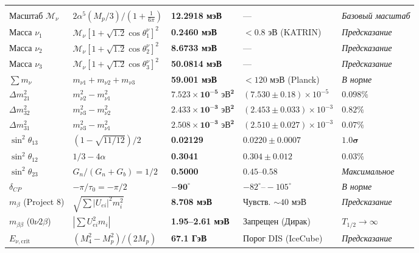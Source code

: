 \documentclass[11pt,a4paper]{article}
\theoremstyle{definition}
\theoremstyle{remark}
\begin{document}
\begin{xltabular}{\textwidth}{>{\raggedright\arraybackslash}p{3.2cm} X >{\centering\arraybackslash}p{2.7cm} >{\centering\arraybackslash}p{3.0cm} >{\raggedleft\arraybackslash}p{2.1cm}}
 \\
Масштаб $\mathcal{M}_\nu$ & $2\alpha^5 (M_p/3) / (1 + \frac{1}{6\pi})$ & \textbf{12.2918 мэВ} & --- & \textit{Базовый масштаб} \\
Масса $\nu_1$ & $\mathcal{M}_\nu [1 + \sqrt{1.2}\cos\theta_1^\nu]^2$ & \textbf{0.2460 мэВ} & $< 0.8$ эВ (KATRIN) & \textit{Предсказание} \\
Масса $\nu_2$ & $\mathcal{M}_\nu [1 + \sqrt{1.2}\cos\theta_2^\nu]^2$ & \textbf{8.6733 мэВ} & --- & \textit{Предсказание} \\
Масса $\nu_3$ & $\mathcal{M}_\nu [1 + \sqrt{1.2}\cos\theta_3^\nu]^2$ & \textbf{50.0814 мэВ} & --- & \textit{Предсказание} \\
$\sum m_\nu$ & $m_{\nu 1} + m_{\nu 2} + m_{\nu 3}$ & \textbf{59.001 мэВ} & $< 120$ мэВ (Planck) & \textit{В норме} \\
$\Delta m_{21}^2$ & $m_{\nu 2}^2 - m_{\nu 1}^2$ & $\mathbf{7.523 \times 10^{-5} \text{ эВ}^2}$ & $(7.530 \pm 0.18) \times 10^{-5}$ & $\mathbf{0.098\%}$ \\
$\Delta m_{32}^2$ & $m_{\nu 3}^2 - m_{\nu 2}^2$ & $\mathbf{2.433 \times 10^{-3} \text{ эВ}^2}$ & $(2.453 \pm 0.033) \times 10^{-3}$ & $\mathbf{0.82\%}$ \\
$\Delta m_{31}^2$ & $m_{\nu 3}^2 - m_{\nu 1}^2$ & $\mathbf{2.508 \times 10^{-3} \text{ эВ}^2}$ & $(2.510 \pm 0.027) \times 10^{-3}$ & $\mathbf{0.07\%}$ \\
$\sin^2\theta_{13}$ & $(1 - \sqrt{11/12})/2$ & \textbf{0.02129} & $0.0220 \pm 0.0007$ & $\mathbf{1.0\sigma}$ \\
$\sin^2\theta_{12}$ & $1/3 - 4\alpha$ & \textbf{0.3041} & $0.304 \pm 0.012$ & $\mathbf{0.03\%}$ \\
$\sin^2\theta_{23}$ & $G_n / (G_n + G_b) = 1/2$ & \textbf{0.5000} & $0.45 \text{--} 0.58$ & \textit{Максимальное} \\
$\delta_{CP}$ & $-\pi/\tau_0 = -\pi/2$ & $\mathbf{-90^\circ}$ & $-82^\circ \text{--} -105^\circ$ & \textit{В норме} \\
$m_\beta$ (Project 8) & $\sqrt{\sum |U_{ei}|^2 m_i^2}$ & \textbf{8.708 мэВ} & Чувств. $\sim 40$ мэВ & \textit{Предсказание} \\
$m_{\beta\beta}$ ($0\nu 2\beta$) & $|\sum U_{ei}^2 m_i|$ & \textbf{1.95--2.61 мэВ} & Запрещен (Дирак) & $T_{1/2} \to \infty$ \\
$E_{\nu, \text{crit}}$ & $(M_4^2 - M_p^2)/(2M_p)$ & \textbf{67.1 ГэВ} & Порог DIS (IceCube) & \textit{Предсказание} \\
\midrule


\end{xltabular}
\end{document}
